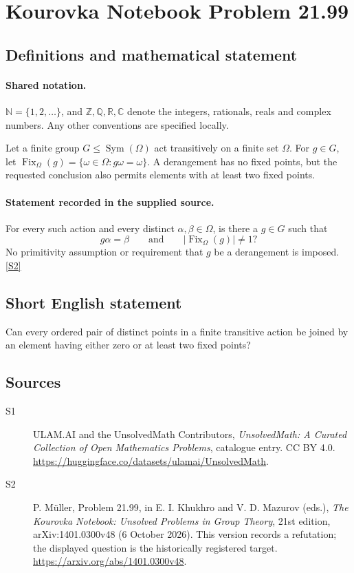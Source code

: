 \documentclass[11pt]{article}
\newcommand{\sref}[2]{\hyperlink{source:#1:#2}{[S#2]}}
\begin{document}
\section{Kourovka Notebook Problem 21.99}\label{statement}

\subsection{Definitions and mathematical statement}

\paragraph{Shared notation.}$\mathbb N=\{1,2,\ldots\}$, and $\mathbb Z,\mathbb Q,\mathbb R,\mathbb C$ denote the integers, rationals, reals and complex numbers. Any other conventions are specified locally.


Let a finite group $G\leq\operatorname{Sym}(\Omega)$ act transitively on a finite set $\Omega$. For $g\in G$, let $\operatorname{Fix}_\Omega(g)=\{\omega\in\Omega:g\omega=\omega\}$. A derangement has no fixed points, but the requested conclusion also permits elements with at least two fixed points.
\paragraph{Statement recorded in the supplied source.}
For every such action and every distinct $\alpha,\beta\in\Omega$, is there a $g\in G$ such that
\[
 g\alpha=\beta\qquad\text{and}\qquad|\operatorname{Fix}_\Omega(g)|\ne1?
\]
No primitivity assumption or requirement that $g$ be a derangement is imposed. \sref{statement}{2}
\subsection{Short English statement}
Can every ordered pair of distinct points in a finite transitive action be joined by an element having either zero or at least two fixed points?
\subsection{Sources}
\begin{description}
\item[\hypertarget{source:statement:1}{S1}] ULAM.AI and the UnsolvedMath Contributors, \emph{UnsolvedMath: A Curated Collection of Open Mathematics Problems}, catalogue entry. CC BY 4.0. \url{https://huggingface.co/datasets/ulamai/UnsolvedMath}.
\item[\hypertarget{source:statement:2}{S2}] P. Müller, Problem 21.99, in E. I. Khukhro and V. D. Mazurov (eds.), \emph{The Kourovka Notebook: Unsolved Problems in Group Theory}, 21st edition, arXiv:1401.0300v48 (6 October 2026). This version records a refutation; the displayed question is the historically registered target. \url{https://arxiv.org/abs/1401.0300v48}.
\end{description}
\label{end:statement}
\end{document}
